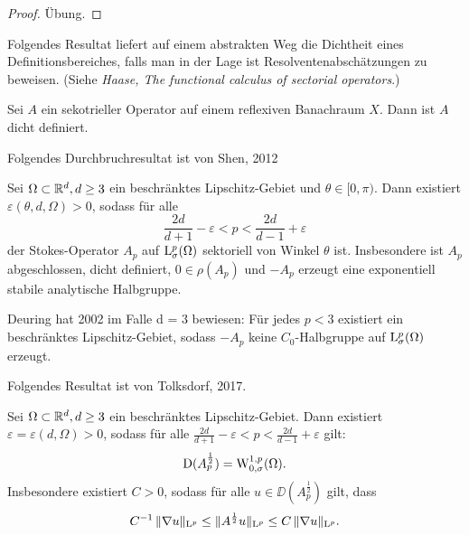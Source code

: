 \begin{proof}
  Übung.
\end{proof}

Folgendes Resultat liefert auf einem abstrakten Weg die Dichtheit eines Definitionsbereiches, falls man in der Lage ist Resolventenabschätzungen zu beweisen.  (Siehe \emph{Haase, The functional calculus of sectorial operators}.)

\begin{thm}
  Sei $A$ ein sekotrieller Operator auf einem reflexiven Banachraum $X$.
  Dann ist $A$ dicht definiert.
\end{thm}

Folgendes Durchbruchresultat ist von Shen, 2012

\begin{hsatz}
  Sei $\Omega \subset \mathbb{R}^d, d \geq 3$ ein beschränktes Lipschitz-Gebiet und $\theta \in [0,\pi)$.
    Dann existiert $\varepsilon(\theta, d, \Omega) > 0$, sodass für alle
    $$
    \frac{2d}{d + 1} - \varepsilon < p < \frac{2d}{d - 1} + \varepsilon
    $$
    der Stokes-Operator $A_p$ auf $\mathrm{L}_\sigma^p(\Omega)$ sektoriell von Winkel $\theta$ ist.
    Insbesondere ist $A_p$ abgeschlossen, dicht definiert, $0 \in \rho(A_p)$ und  $-A_p$ erzeugt eine exponentiell stabile analytische Halbgruppe.
\end{hsatz}

\begin{rem}
  Deuring hat 2002 im Falle d = 3 bewiesen: Für jedes $p < 3$ existiert ein beschränktes Lipschitz-Gebiet, sodass $-A_p$ keine $C_0$-Halbgruppe auf $\mathrm{L}_\sigma^p(\Omega)$ erzeugt.
\end{rem}

Folgendes Resultat ist von Tolksdorf, 2017.

\begin{hsatz}
  Sei $\Omega \subset \mathbb{R}^d, d \geq 3$ ein beschränktes Lipschitz-Gebiet.
  Dann existiert $\varepsilon = \varepsilon(d,\Omega) > 0$, sodass für alle 
  $
  \frac{2d}{d + 1} - \varepsilon < p < \frac{2d}{d - 1} + \varepsilon
  $
  gilt:
  $$
  \mathrm{D}(A_p^{\frac{1}{2}}) = \mathrm{W}_{0,\sigma}^{1,p}(\Omega).
  $$
  Insbesondere existiert $C > 0$, sodass für alle $u \in \DD(A_p^{\frac{1}{2}})$ gilt, dass
  $$
  C^{-1} \, \|\nabla u\|_{\mathrm{L}^p} \leq \| A^{\frac{1}{2}} u\|_{\mathrm{L}^p} \leq C \, \|\nabla u\|_{\mathrm{L}^p}.
  $$
\end{hsatz}
